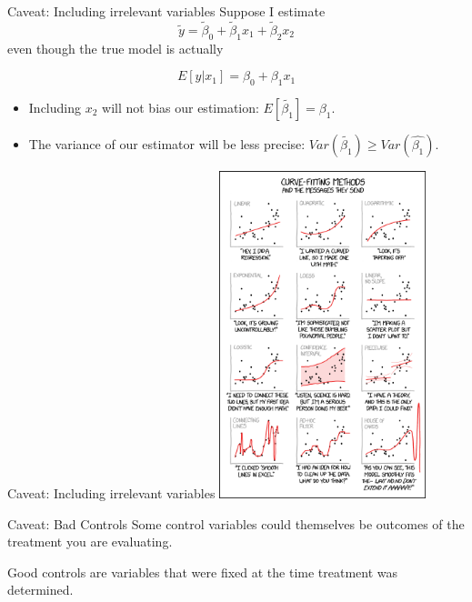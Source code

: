 \documentclass[
  ignorenonframetext,
]{beamer}
\begin{document}
\begin{frame}{Caveat: Including irrelevant variables}
\protect\hypertarget{caveat-including-irrelevant-variables}{}
Suppose I estimate \[
\tilde y=\tilde \beta_0 + \tilde \beta_1x_1 + \tilde\beta_2x_2
\] even though the true model is actually

\[
E[y|x_1]=\beta_0+\beta_1x_1
\]

\begin{itemize}
\item
  Including \(x_2\) will not bias our estimation:
  \(E[\tilde{\beta_1}]= \beta_1\).
\item
  The variance of our estimator will be less precise:
  \(Var(\tilde{\beta_1})\geq Var(\hat{\beta_1})\).
\end{itemize}
\end{frame}

\begin{frame}{Caveat: Including irrelevant variables}
\protect\hypertarget{caveat-including-irrelevant-variables-1}{}
\center \includegraphics[width=0.45\textwidth,height=\textheight]{"images/curvefittingcomic.png"}
\end{frame}

\begin{frame}{Caveat: Bad Controls}
\protect\hypertarget{caveat-bad-controls}{}
Some control variables could themselves be outcomes of the treatment you
are evaluating.

Good controls are variables that were fixed at the time treatment was
determined.
\end{frame}
\end{document}
